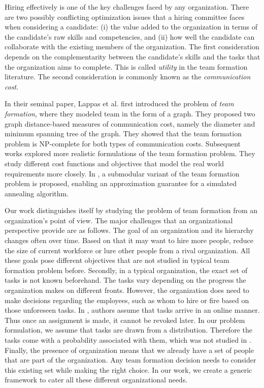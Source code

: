 Hiring effectively is one of the key challenges faced by any organization.
There are two possibly conflicting optimization issues that a hiring committee faces when considering a candidate: 
(i) the value added to the organization in terms of the candidate's raw skills and competencies, and 
(ii) how well the candidate can collaborate with the existing members of the organization.
The first consideration depends on the complementarity between the candidate's skills and the tasks that the organization aims to complete. 
This is called \textit{utility} in the team formation literature.
The second consideration is commonly known as the \textit{communication cost}.

In their seminal paper, Lappas et al. \cite{lappas2009finding} first introduced the problem of \textit{team formation}, where they modeled team in the form of a graph.
They proposed two graph distance-based measures of communication cost, namely the diameter and minimum spanning tree of the graph. 
They showed that the team formation problem is NP-complete for both types of communication costs. 
Subsequent works  \cite{sozio2010community, kargar2011discovering, anagnostopoulos2010power, rangapuram2013towards} explored more realistic formulations of the team formation problem. They study different cost functions and objectives that model the real world requirements more closely.
In \cite{bhowmik2014submodularity}, a submodular variant of the team formation problem is proposed, enabling an approximation guarantee for a simulated annealing algorithm.

Our work distinguishes itself by studying the problem of team formation from an organization's point of view. The major challenges that an organizational perspective provide are as follows. The goal of an organization and its hierarchy changes often over time. Based on that it may want to hire more people, reduce the size of current workforce or lure other people from a rival organization. All these goals pose different objectives that are not studied in typical team formation problem before. Secondly, in a typical organization, the exact set of tasks is not known beforehand. The tasks vary depending on the progress the organization makes on different fronts. However, the organization does need to make decisions regarding the employees, such as whom to hire or fire based on those unforeseen tasks. In \cite{anagnostopoulos2012online}, authors assume that tasks arrive in an online manner. Thus once an assignment is made, it cannot be revoked later. In our problem formulation, we assume that tasks are drawn from a distribution. Therefore the tasks come with a probability associated with them, which was not studied in \cite{anagnostopoulos2012online}. Finally, the presence of organization means that we already have a set of people that are part of the organization. Any team formation decision needs to consider this existing set while making the right choice. In our work, we create a generic framework to cater all these different organizational needs.

